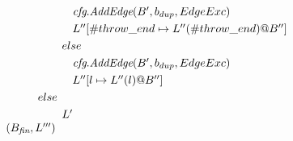 \[\begin{array}{l@{}l@{~}l}
& & \phantom{L_{\emph{fin}} \letval \Fold if} \emph{cfg}.\emph{AddEdge}(B',b_{dup}, EdgeExc)\\
& & \phantom{L_{\emph{fin}} \letval \Fold if} L''[\#throw\_end \mapsto L''(\#throw\_end)@B'']\\
& & \phantom{L_{\emph{fin}} \letval \Fold}else\\
& & \phantom{L_{\emph{fin}} \letval \Fold if} \emph{cfg}.\emph{AddEdge}(B',b_{dup}, EdgeExc)\\
& & \phantom{L_{\emph{fin}} \letval \Fold if} L''[l \mapsto L''(l)@B'']\\
& & \phantom{L_{\emph{fin}} \letval} else\\
& & \phantom{L_{\emph{fin}} \letval \Fold} L'\\
& & (B_{\emph{fin}},L''')\\
& & \\
\end{array}
\]
\newpage
